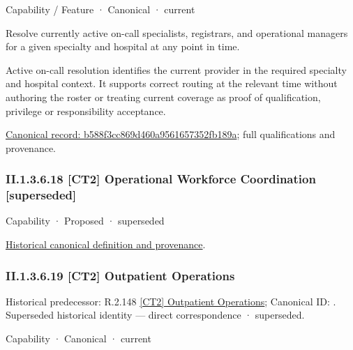 \label{element:b588f3cc869d460a9561657352fb189a}
{\small Capability / Feature · Canonical · current}\par

Resolve currently active on-call specialists, registrars, and operational managers for a given specialty and hospital at any point in time.



Active on-call resolution identifies the current provider in the required specialty and hospital context. It supports correct routing at the relevant time without authoring the roster or treating current coverage as proof of qualification, privilege or responsibility acceptance.


{\footnotesize \href{../../../../../../../continuum/strategy/capability/feature/b588f3cc869d460a9561657352fb189a.md}{Canonical record: b588f3cc869d460a9561657352fb189a}; full qualifications and provenance.}\par
\subsubsection*{II.1.3.6.18 [CT2] Operational Workforce Coordination [superseded]}
\label{navigation:II.1.3.6.18}

\label{element:66e72222f2064a23adbdb0311092918b}
{\small Capability · Proposed · superseded}\par
\href{../../../../../../../continuum/strategy/capability/66e72222f2064a23adbdb0311092918b.md}{Historical canonical definition and provenance}.\par
\subsubsection*{II.1.3.6.19 [CT2] Outpatient Operations}
\label{navigation:II.1.3.6.19}

{\small Historical predecessor: R.2.148 \hyperref[element:3db41bc06ade4f9088eec7b8aedd7448]{[CT2] Outpatient Operations}; Canonical ID: \texttt{}. Superseded historical identity — direct correspondence · superseded.}\par
\label{element:21399d52b9624ddfbeb786f1d72e40c3}
{\small Capability · Canonical · current}\par


